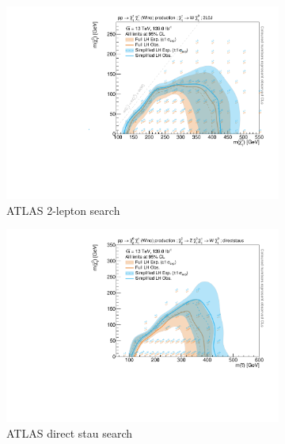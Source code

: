 \begin{figure}
\begin{subfigure}[b]{0.5\textwidth}
		\centering\includegraphics[width=\textwidth]{exclusion_2L0J_CLs_noLabel}
		\caption{ATLAS 2-lepton search~\cite{SUSY-2018-32}\label{fig:results_2L0J}}
	\end{subfigure}\hfill
	\begin{subfigure}[b]{0.5\textwidth}
		\centering\includegraphics[width=\textwidth]{exclusion_directstaus_CLs_noLabel}
		\caption{ATLAS direct stau search~\cite{SUSY-2018-04}\label{fig:results_directstaus}}
	\end{subfigure}\hfill
	\begin{subfigure}[b]{0.5\textwidth}

\end{subfigure}
\end{figure}
